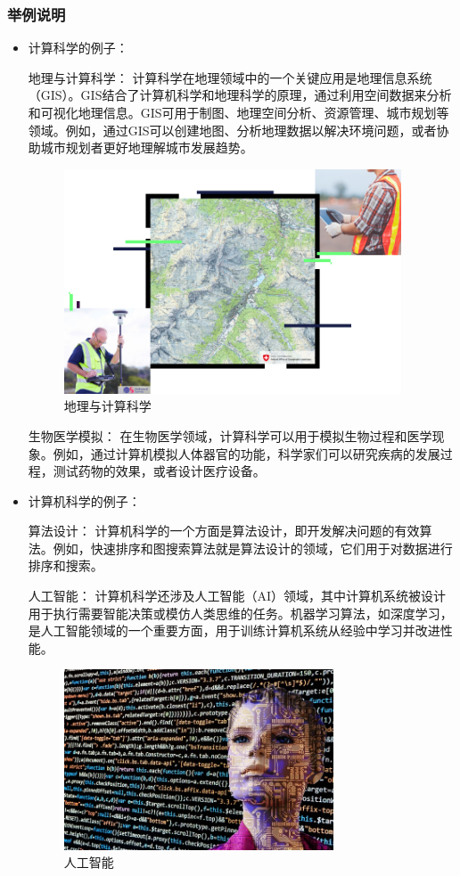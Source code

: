 \documentclass[square]{article}
\begin{document}
\subsubsection{举例说明}
\begin{itemize}
\item 计算科学的例子：\par

地理与计算科学\cite{ref2}： 计算科学在地理领域中的一个关键应用是地理信息系统（GIS）。GIS结合了计算机科学和地理科学的原理，通过利用空间数据来分析和可视化地理信息。GIS可用于制图、地理空间分析、资源管理、城市规划等领域。例如，通过GIS可以创建地图、分析地理数据以解决环境问题，或者协助城市规划者更好地理解城市发展趋势。\par

\begin{figure}[h!]
	\centering
	\includegraphics[width=10cm]{geo.png}
	\caption{地理与计算科学}
	\label{fig:geo}
\end{figure}

生物医学模拟： 在生物医学领域，计算科学可以用于模拟生物过程和医学现象。例如，通过计算机模拟人体器官的功能，科学家们可以研究疾病的发展过程，测试药物的效果，或者设计医疗设备。\par

\item 计算机科学的例子：\par
算法设计： 计算机科学的一个方面是算法设计，即开发解决问题的有效算法。例如，快速排序和图搜索算法就是算法设计的领域，它们用于对数据进行排序和搜索。\par
人工智能： 计算机科学还涉及人工智能（AI）领域，其中计算机系统被设计用于执行需要智能决策或模仿人类思维的任务。机器学习算法，如深度学习\cite{ref3}，是人工智能领域的一个重要方面，用于训练计算机系统从经验中学习并改进性能。\par
\begin{figure}[h!]
	\centering
	\includegraphics[width=8cm]{ai}
	\caption{人工智能}
	\label{fig:ai}
\end{figure}

\end{itemize}
\end{document}
